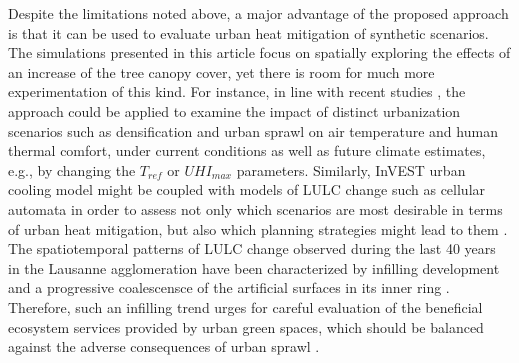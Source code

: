 \documentclass[10pt,letterpaper]{article}
\begin{document}


Despite the limitations noted above, a major advantage of the proposed approach is that it can be used to evaluate urban heat mitigation of synthetic scenarios.
The simulations presented in this article focus on spatially exploring the effects of an increase of the tree canopy cover, yet there is room for much more experimentation of this kind.
For instance, in line with recent studies \cite{lemonsu2015vulnerability,yang2016contrasting,trimmel2019thermal}, the approach could be applied to examine the impact of distinct urbanization scenarios such as densification and urban sprawl on air temperature and human thermal comfort, under current conditions as well as future climate estimates, e.g., by changing the $T_{ref}$ or $UHI_{max}$ parameters.
Similarly, InVEST urban cooling model might be coupled with models of LULC change such as cellular automata in order to assess not only which scenarios are most desirable in terms of urban heat mitigation, but also which planning strategies might lead to them \cite{silva2008strategies,bosch2019addressing}.
The spatiotemporal patterns of LULC change observed during the last 40 years in the Lausanne agglomeration have been characterized by infilling development and a progressive coalescensce of the artificial surfaces in its inner ring \cite{bosch2020spatiotemporal}.
Therefore, such an infilling trend urges for careful evaluation of the beneficial ecosystem services provided by urban green spaces, which should be balanced against the adverse consequences of urban sprawl \cite{haaland2015challenges,artmann2019urban}.
\end{document}
